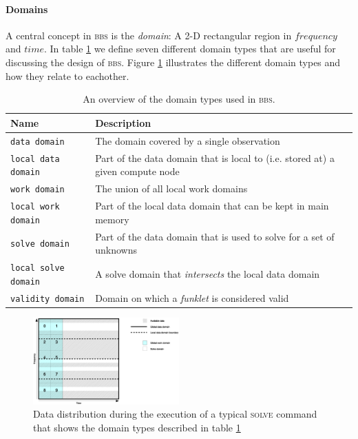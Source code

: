 \documentclass[10pt]{lofar}
\newcommand{\bbs}{\textsc{bbs}\xspace}
\begin{document}
\paragraph{Domains}
A central concept in \bbs is the \emph{domain}: A 2-D rectangular region in $frequency$ and $time$. In table \ref{tab:domains} we define seven different domain types that are useful for discussing the design of \bbs. Figure \ref{fig:domains} illustrates the different domain types and how they relate to eachother.
\begin{table}[htb!]
\centering
\begin{tabular}{lp{}}
\hline
\textbf{Name} & \textbf{Description}\\
\hline
\texttt{data domain} & The domain covered by a single observation\\
\hline
\texttt{local data domain} & Part of the data domain that is local to (i.e. stored at) a given compute node\\
\hline
\texttt{work domain} & The union of all local work domains\\
\hline
\texttt{local work domain} & Part of the local data domain that can be kept in main memory\\
\hline
\texttt{solve domain} & Part of the data domain that is used to solve for a set of unknowns\\
\hline
\texttt{local solve domain} & A solve domain that \emph{intersects} the local data domain\\
\hline
\texttt{validity domain} & Domain on which a \emph{funklet} is considered valid\\
\end{tabular}
\caption{An overview of the domain types used in \bbs.}
\label{tab:domains}
\end{table}

\begin{figure}[htbp]
\centering
\includegraphics[width=0.5\textwidth]{images/domains.eps}
\caption{Data distribution during the execution of a typical \textsc{solve} command that shows the domain types described in table \ref{tab:domains}}
\label{fig:domains}
\end{figure}
\end{document}
